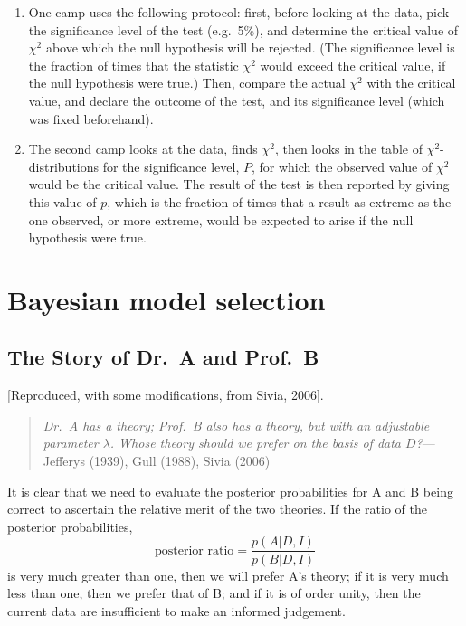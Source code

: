 \documentclass[%
oneside,                 %
final,                   %
10pt]{article}
\begin{document}
\begin{enumerate}
\item One camp uses the following protocol: first, before looking at the data, pick the significance level of the test (e.g.~5\%), and determine the critical value of $\chi^2$ above which the null hypothesis will be rejected. (The significance level is the fraction of times that the statistic $\chi^2$ would exceed the critical value, if the null hypothesis were true.) Then, compare the actual $\chi^2$ with the critical value, and declare the outcome of the test, and its significance level (which was fixed beforehand).

\item The second camp looks at the data, finds $\chi^2$, then looks in the table of $\chi^2$-distributions for the significance level, $P$, for which the observed value of $\chi^2$ would be the critical value. The result of the test is then reported by giving this value of $p$, which is the fraction of times that a result as extreme as the one observed, or more extreme, would be expected to arise if the null hypothesis were true. 
\end{enumerate}

\noindent
\section{Bayesian model selection}
\subsection{The Story of Dr.~A and Prof.~B}
[Reproduced, with some modifications, from Sivia, 2006].

\begin{quote}
\emph{Dr.~A has a theory; Prof.~B also has a theory, but with an adjustable parameter $\lambda$. Whose theory should we prefer on the basis of data $D$?}--- Jefferys (1939), Gull (1988), Sivia (2006)
\end{quote}


It is clear that we need to evaluate the posterior probabilities for A and B being correct to ascertain the relative merit of the two theories. If the ratio of the posterior probabilities,
\begin{equation}
\text{posterior ratio} = \frac{p(A |D, I )}{p(B|D,I)}
\label{eq:sivia_41}
\end{equation}
is very much greater than one, then we will prefer A’s theory; if it is very much less than one, then we prefer that of B; and if it is of order unity, then the current data are insufficient to make an informed judgement.
\end{document}
